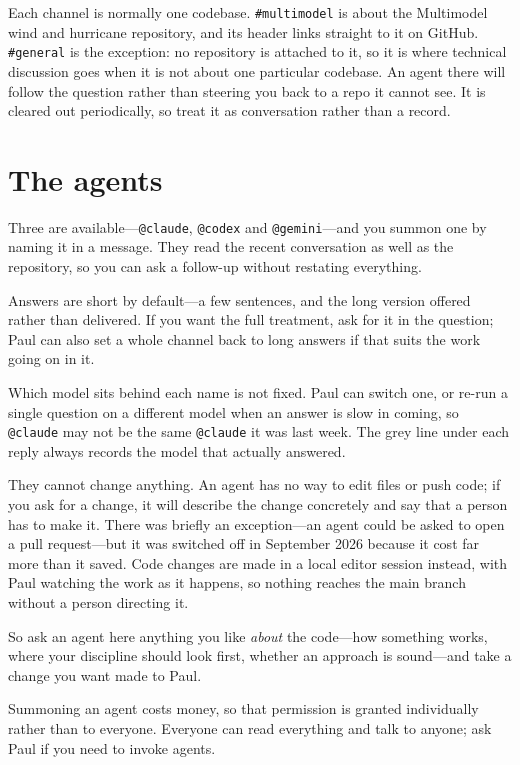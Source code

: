 \documentclass[11pt,letterpaper]{article}
\begin{document}
Each channel is normally one codebase. \texttt{\#multimodel} is about the
Multimodel wind and hurricane repository, and its header links straight to it on
GitHub. \texttt{\#general} is the exception: no repository is attached to it, so it is
where technical discussion goes when it is not about one particular codebase.
An agent there will follow the question rather than steering you back to a repo
it cannot see. It is cleared out periodically, so treat it as conversation
rather than a record.

\section{The agents}

Three are available---\texttt{@claude}, \texttt{@codex} and \texttt{@gemini}---and
you summon one by naming it in a message. They read the recent conversation as
well as the repository, so you can ask a follow-up without restating everything.

Answers are short by default---a few sentences, and the long version offered
rather than delivered. If you want the full treatment, ask for it in the
question; Paul can also set a whole channel back to long answers if that suits
the work going on in it.

Which model sits behind each name is not fixed. Paul can switch one, or re-run
a single question on a different model when an answer is slow in coming, so
\texttt{@claude} may not be the same \texttt{@claude} it was last week. The
grey line under each reply always records the model that actually answered.

They cannot change anything. An agent has no way to edit files or push code; if
you ask for a change, it will describe the change concretely and say that a
person has to make it. There was briefly an exception---an agent could be asked
to open a pull request---but it was switched off in September 2026 because it
cost far more than it saved. Code changes are made in a local editor session
instead, with Paul watching the work as it happens, so nothing reaches the main
branch without a person directing it.

So ask an agent here anything you like \emph{about} the code---how something
works, where your discipline should look first, whether an approach is
sound---and take a change you want made to Paul.

Summoning an agent costs money, so that permission is granted individually
rather than to everyone. Everyone can read everything and talk to anyone; ask
Paul if you need to invoke agents.
\end{document}
